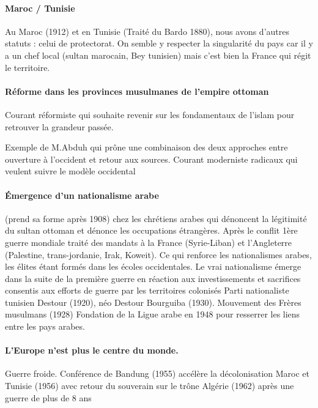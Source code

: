 \paragraph{Maroc / Tunisie}
Au Maroc (1912) et en Tunisie (Traité du Bardo 1880), nous avons d’autres statuts : celui de protectorat. On semble y respecter la singularité du pays car il y a un chef local (sultan marocain, Bey tunisien) mais c’est bien la France qui régit le territoire.


 \paragraph{Réforme dans les provinces musulmanes de l’empire ottoman}

Courant réformiste qui souhaite revenir sur les fondamentaux de l’islam pour retrouver la grandeur passée. 
\begin{Ex}[Abduh]
Exemple de M.Abduh qui prône une combinaison des deux approches entre ouverture à l’occident et retour aux sources.
Courant moderniste radicaux qui veulent suivre le modèle occidental
\end{Ex}


\paragraph{Émergence d’un nationalisme arabe}
 (prend sa forme après 1908) chez les chrétiens arabes qui dénoncent la légitimité du sultan ottoman et dénonce les occupations étrangères.
Après le conflit 1ère guerre mondiale traité des mandats à la France (Syrie-Liban) et l’Angleterre (Palestine, trans-jordanie, Irak, Koweit). Ce qui renforce les nationalismes arabes, les élites étant formés dans les écoles occidentales. Le vrai nationalisme émerge dans la suite de la première guerre en réaction aux investissements et sacrifices consentis aux efforts de guerre par les territoires colonisés
Parti nationaliste tunisien Destour (1920), néo Destour Bourguiba (1930).
Mouvement des Frères musulmans (1928)
Fondation de la Ligue arabe en 1948 pour resserrer les liens entre les pays arabes.

\paragraph{L’Europe n’est plus le centre du monde.
}
Guerre froide.
Conférence de Bandung (1955) accélère la décolonisation
Maroc et Tunisie (1956) avec retour du souverain sur le trône
Algérie (1962) après une guerre de plus de 8 ans

